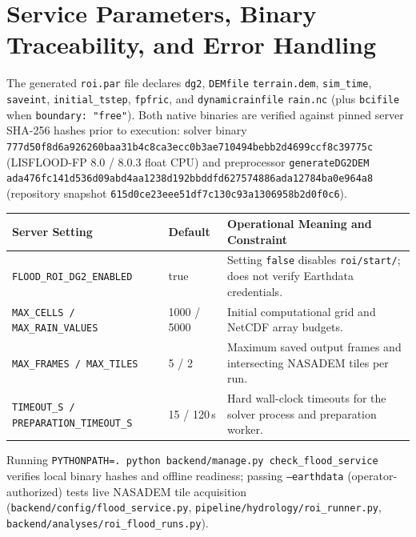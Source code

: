 \documentclass[11pt,a4paper]{article}
\newcommand{\src}[1]{\nolinkurl{#1}}
\begin{document}
\section{Service Parameters, Binary Traceability, and Error Handling}
\label{sec:operacion}
The generated \texttt{roi.par} file declares \texttt{dg2}, \src{DEMfile} \src{terrain.dem}, \texttt{sim\_time}, \texttt{saveint}, \src{initial_tstep}, \src{fpfric}, and \src{dynamicrainfile} \src{rain.nc} (plus \texttt{bcifile} when \texttt{boundary: "free"}). Both native binaries are verified against pinned server SHA-256 hashes prior to execution: solver binary \src{777d50f8d6a926260baa31b4c8ca3ecc0b3ae710494bebb2d4699ccf8c39775c} (LISFLOOD-FP 8.0 / 8.0.3 float CPU) and preprocessor \texttt{generateDG2DEM} \src{ada476fc141d536d09abd4aa1238d192bbddfd627574886ada12784ba0e964a8} (repository snapshot \src{615d0ce23eee51df7c130c93a1306958b2d0f0c6}).

\noindent\begin{tabularx}{\linewidth}{p{.28\linewidth}p{.15\linewidth}X}
\toprule Server Setting & Default & Operational Meaning and Constraint\\\midrule
\texttt{FLOOD\_ROI\_DG2\_ENABLED} & true & Setting \texttt{false} disables \texttt{roi/start/}; does not verify Earthdata credentials.\\
\texttt{MAX\_CELLS / MAX\_RAIN\_VALUES} & 1000 / 5000 & Initial computational grid and NetCDF array budgets.\\
\texttt{MAX\_FRAMES / MAX\_TILES} & 5 / 2 & Maximum saved output frames and intersecting NASADEM tiles per run.\\
\texttt{TIMEOUT\_S / PREPARATION\_TIMEOUT\_S} & 15 / 120\,s & Hard wall-clock timeouts for the solver process and preparation worker.\\\bottomrule
\end{tabularx}
Running \texttt{PYTHONPATH=. python backend/manage.py check\_flood\_service} verifies local binary hashes and offline readiness; passing \texttt{--earthdata} (operator-authorized) tests live NASADEM tile acquisition (\src{backend/config/flood_service.py}, \src{pipeline/hydrology/roi_runner.py}, \src{backend/analyses/roi_flood_runs.py}).
\end{document}
